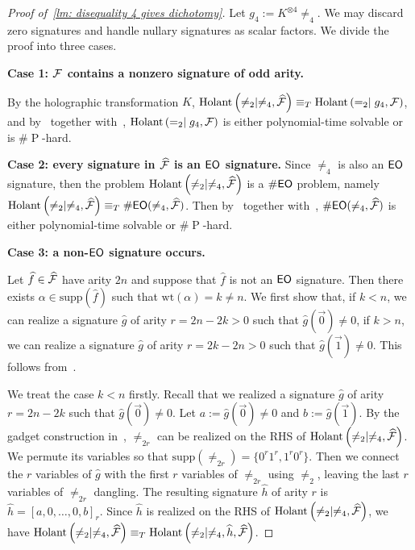 \DisFourgivesHard*
\begin{proof}[Proof of~\cref{lm: disequality 4 gives dichotomy}]

    Let $g_4:=K^{\otimes 4}\neq_4$. We may discard zero signatures and handle nullary signatures as scalar factors. We divide the proof into three cases.

    \textbf{Case 1: $\mathcal{F}$ contains a nonzero signature of odd arity.}

    By the holographic transformation $K$, $\operatorname{Holant}\left(\neq_2\mid \neq_4,\widehat{\mathcal{F}}\right)\equiv_T \operatorname{Holant}\left(=_2\mid g_4,\mathcal{F}\right)$, and by~ together with~\cite{GSS26}, $\operatorname{Holant}\left(=_2\mid g_4,\mathcal{F}\right)$ is either polynomial-time solvable or is $\#\operatorname{P}$-hard.

    \textbf{Case 2: every signature in $\widehat{\mathcal{F}}$ is an $\textup{\textsf{EO}}$ signature.}
    Since $\neq_4$ is also an $\textup{\textsf{EO}}$ signature, then the problem $\operatorname{Holant}\left(\neq_2\mid \neq_4,\widehat{\mathcal{F}}\right)$ is a $\textup{\#\textsf{EO}}$ problem, namely $\operatorname{Holant}\left(\neq_2\mid \neq_4,\widehat{\mathcal{F}}\right)\equiv_T \textup{\#\textsf{EO}}(\neq_4,\widehat{\mathcal{F}})$. Then by~ together with~\cite{GSS26}, $\textup{\#\textsf{EO}}(\neq_4,\widehat{\mathcal{F}})$ is either polynomial-time solvable or $\#\operatorname{P}$-hard.

    \textbf{Case 3: a non-$\textup{\textsf{EO}}$ signature occurs.}

    Let $\widehat{f}\in \widehat{\mathcal{F}}$ have arity $2n$ and suppose that $\widehat{f}$ is not an $\textup{\textsf{EO}}$ signature. Then there exists $\alpha\in\mathrm{supp}(\widehat{f})$ such that $\mathrm{wt}(\alpha)=k\neq n$. We first show that, if $k<n$, we can realize a signature  $\widehat{g}$ of arity $r=2n-2k>0$ such that $\widehat{g}(\vec{0})\neq 0$, if $k>n$, we can realize a signature  $\widehat{g}$ of arity $r=2k-2n>0$ such that $\widehat{g}(\vec{1})\neq 0$. This follows from~\cite{Holant_Odd}.

    We treat the case $k<n$ firstly. Recall that we realized a signature $\widehat{g}$ of arity $r=2n-2k$ such that $\widehat{g}(\vec{0})\neq 0$. Let $a:=\widehat{g}(\vec{0})\neq 0$ and $b:=\widehat{g}(\vec{1})$. By the gadget construction in~\cite{cai-fu-shao-eo}, $\neq_{2r}$ can be realized on the RHS of $\operatorname{Holant}\left(\neq_2\mid \neq_4,\widehat{\mathcal{F}}\right)$. We permute its variables so that $\mathrm{supp}(\neq_{2r})=\{0^r1^r,1^r0^r\}$. Then we connect the $r$ variables of $\widehat{g}$ with the first $r$ variables of $\neq_{2r}$ using $\neq_2$, leaving the last $r$ variables of $\neq_{2r}$ dangling. The resulting signature $\widehat{h}$ of arity $r$ is $\widehat{h}=[a,0,\dots,0,b]_r$. Since $\widehat{h}$ is realized on the RHS of $\operatorname{Holant}\left(\neq_2\mid \neq_4,\widehat{\mathcal{F}}\right)$, we have $\operatorname{Holant}\left(\neq_2\mid \neq_4,\widehat{\mathcal{F}}\right)\equiv_T \operatorname{Holant}\left(\neq_2\mid \neq_4,\widehat{h},\widehat{\mathcal{F}}\right)$.


\end{proof}
